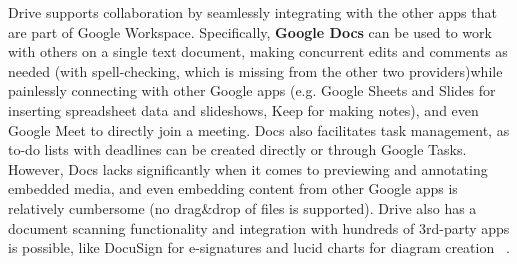 Drive supports collaboration by seamlessly integrating with the other apps that are part of Google Workspace. Specifically, \textbf{Google Docs} can be used to work with others on a single text document, making concurrent edits  and comments as needed (with spell-checking, which is missing from the other two providers)while painlessly connecting with other Google apps (e.g. Google Sheets and Slides for inserting spreadsheet data and slideshows,  Keep for making notes), and even Google Meet to directly join a meeting. Docs also facilitates task management, as to-do lists with deadlines can be created directly or through Google Tasks. However, Docs lacks significantly when it comes to previewing and annotating embedded media, and even embedding content from other Google apps is relatively cumbersome (no drag\&drop of files is supported).  Drive also has a document scanning functionality and integration with hundreds of 3rd-party apps is possible, like DocuSign for e-signatures and lucid charts for diagram creation ~\cite{google_drive,google_docs,google_apps}.

